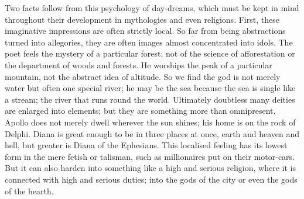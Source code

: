 Two facts follow from this psychology of day-dreams, which must be kept in mind throughout their development in mythologies and even religions. First, these imaginative impressions are often strictly local. So far from being abstractions turned into allegories, they are often images almost concentrated into idols. The poet feels the mystery of a particular forest; not of the science of afforestation or the department of woods and forests. He worships the peak of a particular mountain, not the abstract idea of altitude. So we find the god is not merely water but often one special river; he may be the sea because the sea is single like a stream; the river that runs round the world. Ultimately doubtless many deities are enlarged into elements; but they are something more than omnipresent. Apollo does not merely dwell wherever the sun shines; his home is on the rock of Delphi. Diana is great enough to be in three places at once, earth and heaven and hell, but greater is Diana of the Ephesians. This localised feeling has its lowest form in the mere fetish or talisman, such as millionaires put on their motor-cars. But it can also harden into something like a high and serious religion, where it is connected with high and serious duties; into the gods of the city or even the gods of the hearth.

